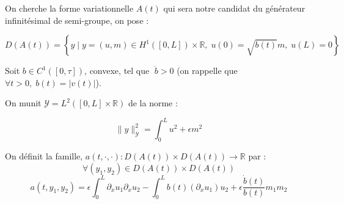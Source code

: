 \documentclass[a4paper]{article}
\newcommand{\dep}{b}
\newcommand{\Y}{\mathscr{Y}}
\begin{document}
On cherche la forme variationnelle $A(t)$ qui sera notre candidat
du générateur infinitésimal de semi-groupe, on pose : 

\[D(A(t)) = \left\{ y \; | \; y = (u,m) \in H^1([0,L])\times \mathbb{R},
 \; u(0)=\sqrt{\dep (t)} m, \; u(L)=0 \right\} \]
 
 
 
  
 \begin{proposition}
  	Soit $b \in C^1([0,\tau])$, convexe, tel que $\; \dot{b}>0$
	(on rappelle que $\forall t>0, \;  \dep (t) = |v(t)|$). 
	
	On munit $\Y = L^2([0,L]\times \mathbb{R})$ de la norme :
  
    \[\| y\|_{\mathscr{Y}}^2 = \int_0^L u^2 + \epsilon m^2 \]
	
   	On définit la famille,
  	$a(t,\cdot, \cdot): D(A(t)) \times D(A(t)) \to \mathbb{R}$ par :
   	\[
   	\forall (y_1,y_2) \in D(A(t)) \times D(A(t))
  	\]
  	\begin{equation}
  		\label{def:a3}
  		 a(t,y_1,y_2) =   \epsilon \int_0^L \partial_xu_1 \partial_xu_2
  		                 - \int_0^L \dep (t) (\partial_xu_1)u_2
                          +\epsilon \displaystyle \frac{\dot{\dep}(t)}{\dep(t)}m_1m_2
  	\end{equation}
  \end{proposition}
\end{document}
